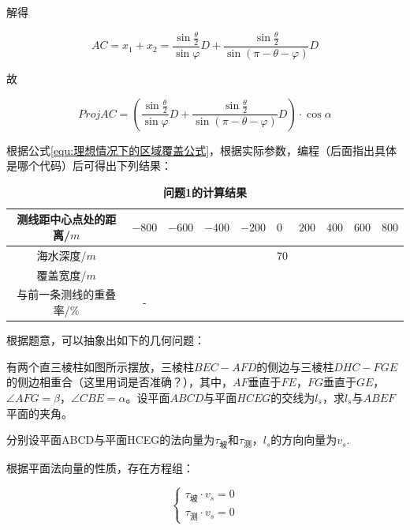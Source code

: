 解得

\begin{equation}
    AC = x_1 + x_2 
       = \frac{\sin\frac{\theta}{2}}{\sin\varphi}D + \frac{\sin\frac{\theta}{2}}{\sin(\pi - \theta - \varphi)}D
\end{equation}

故

\begin{equation}
    Proj AC = \left(\frac{\sin\frac{\theta}{2}}{\sin\varphi}D + \frac{\sin\frac{\theta}{2}}{\sin(\pi - \theta - \varphi)}D\right) \cdot \cos \alpha
    \label{equ:理想情况下的区域覆盖公式}
\end{equation}

根据公式\ref{equ:理想情况下的区域覆盖公式}，根据实际参数，编程（后面指出具体是哪个代码）后可得出下列结果：

\begin{table}[h]
    \centering
    \caption{\textbf{问题1的计算结果}}
    \begin{tabular}{@{}ccllllllll@{}}
    \toprule
    测线距中心点处的距离/$m$  & $-800$ & $-600$ & $-400$ & $-200$ & $0$ & $200$ & $400$ & $600$ & $800$ \\ \midrule
    海水深度/$m$        &      &      &      &      & 70  &     &     &     &     \\
    覆盖宽度/$m$        &      &      &      &      &   &     &     &     &     \\
    与前一条测线的重叠率/$\%$ &   -  &      &      &      &   &     &     &     &     \\ \bottomrule
    \end{tabular}
\end{table}



根据题意，可以抽象出如下的几何问题：

有两个直三棱柱如图所示摆放，三棱柱$BEC-AFD$的侧边与三棱柱$DHC-FGE$的侧边相重合（这里用词是否准确？），其中，$AF$垂直于$FE$，$FG$垂直于$GE$，$\angle AFG=\beta$，$\angle CBE=\alpha$。设平面$ABCD$与平面$HCEG$的交线为$l_s$，求$l_s$与$ABEF$平面的夹角。

分别设平面ABCD与平面HCEG的法向量为$\tau_\text{坡}$和$\tau_\text{测}$，$l_s$的方向向量为$v_s$.

根据平面法向量的性质，存在方程组：

\begin{equation}
    \begin{cases}
        \tau_\text{坡} \cdot v_s = 0 \\
        \tau_\text{测} \cdot v_s = 0
    \end{cases}
\end{equation}

